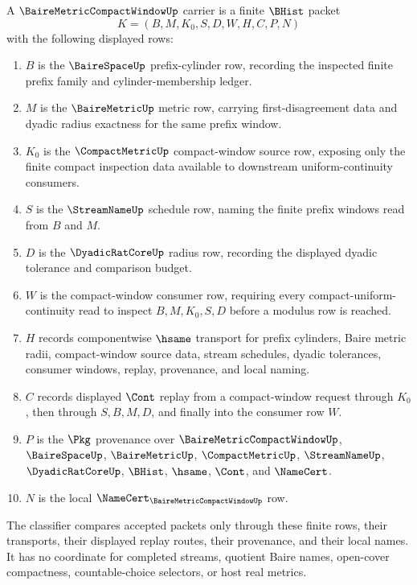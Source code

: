 \begin{definition}
\label{def:baire-metric-compact-window-carrier}
A $\BaireMetricCompactWindowUp$ carrier is a finite $\BHist$ packet
$$
K=(B,M,K_0,S,D,W,H,C,P,N)
$$
with the following displayed rows:
\begin{enumerate}
\item $B$ is the $\BaireSpaceUp$ prefix-cylinder row, recording the inspected finite prefix family and cylinder-membership ledger.
\item $M$ is the $\BaireMetricUp$ metric row, carrying first-disagreement data and dyadic radius exactness for the same prefix window.
\item $K_0$ is the $\CompactMetricUp$ compact-window source row, exposing only the finite compact inspection data available to downstream uniform-continuity consumers.
\item $S$ is the $\StreamNameUp$ schedule row, naming the finite prefix windows read from $B$ and $M$.
\item $D$ is the $\DyadicRatCoreUp$ radius row, recording the displayed dyadic tolerance and comparison budget.
\item $W$ is the compact-window consumer row, requiring every compact-uniform-continuity read to inspect $B,M,K_0,S,D$ before a modulus row is reached.
\item $H$ records componentwise $\hsame$ transport for prefix cylinders, Baire metric radii, compact-window source data, stream schedules, dyadic tolerances, consumer windows, replay, provenance, and local naming.
\item $C$ records displayed $\Cont$ replay from a compact-window request through $K_0$, then through $S,B,M,D$, and finally into the consumer row $W$.
\item $P$ is the $\Pkg$ provenance over $\BaireMetricCompactWindowUp$, $\BaireSpaceUp$, $\BaireMetricUp$, $\CompactMetricUp$, $\StreamNameUp$, $\DyadicRatCoreUp$, $\BHist$, $\hsame$, $\Cont$, and $\NameCert$.
\item $N$ is the local $\NameCert_{\BaireMetricCompactWindowUp}$ row.
\end{enumerate}
The classifier compares accepted packets only through these finite rows, their transports, their displayed replay routes, their provenance, and their local names. It has no coordinate for completed streams, quotient Baire names, open-cover compactness, countable-choice selectors, or host real metrics.
\end{definition}

